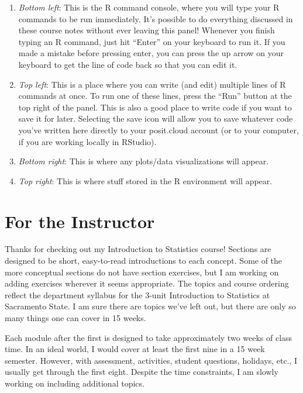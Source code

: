 \documentclass[
]{book}
\providecommand{\tightlist}{%
  \setlength{\itemsep}{0pt}\setlength{\parskip}{0pt}}
\begin{document}
\begin{enumerate}
\def\labelenumi{\arabic{enumi}.}
\tightlist
\item
  \emph{Bottom left}: This is the R command console, where you will type your R commands to be run immediately. It's possible to do everything discussed in these course notes without ever leaving this panel! Whenever you finish typing an R command, just hit ``Enter'' on your keyboard to run it. If you made a mistake before pressing enter, you can press the up arrow on your keyboard to get the line of code back so that you can edit it.
\item
  \emph{Top left}: This is a place where you can write (and edit) multiple lines of R commands at once. To run one of these lines, press the ``Run'' button at the top right of the panel. This is also a good place to write code if you want to save it for later. Selecting the save icon will allow you to save whatever code you've written here directly to your posit.cloud account (or to your computer, if you are working locally in RStudio).
\item
  \emph{Bottom right}: This is where any plots/data visualizations will appear.
\item
  \emph{Top right}: This is where stuff stored in the R environment will appear.
\end{enumerate}

\section*{For the Instructor}\label{for-the-instructor}

Thanks for checking out my Introduction to Statistics course! Sections are designed to be short, easy-to-read introductions to each concept. Some of the more conceptual sections do not have section exercises, but I am working on adding exercises wherever it seems appropriate. The topics and course ordering reflect the department syllabus for the 3-unit Introduction to Statistics at Sacramento State. I am sure there are topics we've left out, but there are only so many things one can cover in 15 weeks.

Each module after the first is designed to take approximately two weeks of class time. In an ideal world, I would cover at least the first nine in a 15 week semester. However, with assessment, activities, student questions, holidays, etc., I usually get through the first eight. Despite the time constraints, I am slowly working on including additional topics.
\end{document}

